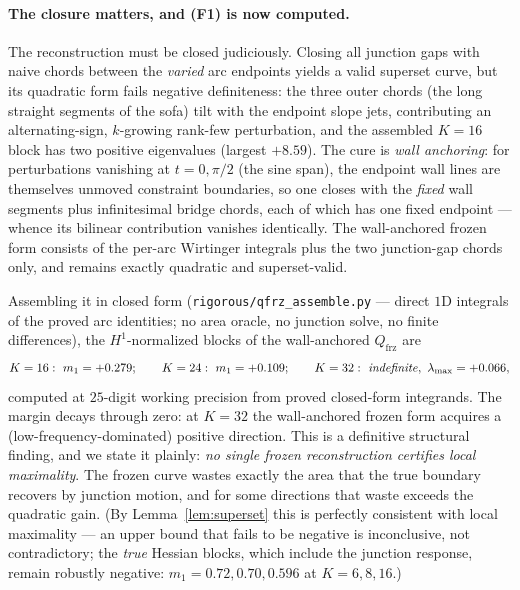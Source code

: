 \documentclass[11pt]{amsart}
\theoremstyle{plain}
\theoremstyle{definition}
\begin{document}
\paragraph{The closure matters, and (F1) is now computed.}
The reconstruction must be closed judiciously.  Closing all junction
gaps with naive chords between the \emph{varied} arc endpoints yields a
valid superset curve, but its quadratic form fails negative
definiteness: the three outer chords (the long straight segments of the
sofa) tilt with the endpoint slope jets, contributing an
alternating-sign, $k$-growing rank-few perturbation, and the assembled
$K=16$ block has two positive eigenvalues (largest $+8.59$).  The cure
is \emph{wall anchoring}: for perturbations vanishing at $t=0,\pi/2$
(the sine span), the endpoint wall lines are themselves unmoved
constraint boundaries, so one closes with the \emph{fixed} wall
segments plus infinitesimal bridge chords, each of which has one fixed
endpoint --- whence its bilinear contribution vanishes identically.
The wall-anchored frozen form consists of the per-arc Wirtinger
integrals plus the two junction-gap chords only, and remains exactly
quadratic and superset-valid.

Assembling it in closed form
(\texttt{rigorous/qfrz\_assemble.py} --- direct $1$D integrals of the
proved arc identities; no area oracle, no junction solve, no finite
differences), the $H^{1}$-normalized blocks of the wall-anchored
$Q_{\mathrm{frz}}$ are
\begin{equation}\label{eq:F1-computed}
   K=16:\ m_{1}=+0.279;\qquad
   K=24:\ m_{1}=+0.109;\qquad
   K=32:\ \text{\emph{indefinite}},\ \lambda_{\max}=+0.066,
\end{equation}
computed at $25$-digit working precision from proved closed-form
integrands.  The margin decays through zero: at $K=32$ the wall-anchored
frozen form acquires a (low-frequency-dominated) positive direction.
This is a definitive structural finding, and we state it plainly:
\emph{no single frozen reconstruction certifies local maximality}.
The frozen curve wastes exactly the area that the true boundary
recovers by junction motion, and for some directions that waste
exceeds the quadratic gain.  (By Lemma~\ref{lem:superset} this is
perfectly consistent with local maximality --- an upper bound that
fails to be negative is inconclusive, not contradictory; the
\emph{true} Hessian blocks, which include the junction response,
remain robustly negative: $m_{1} = 0.72, 0.70, 0.596$ at
$K = 6, 8, 16$.)
\end{document}
